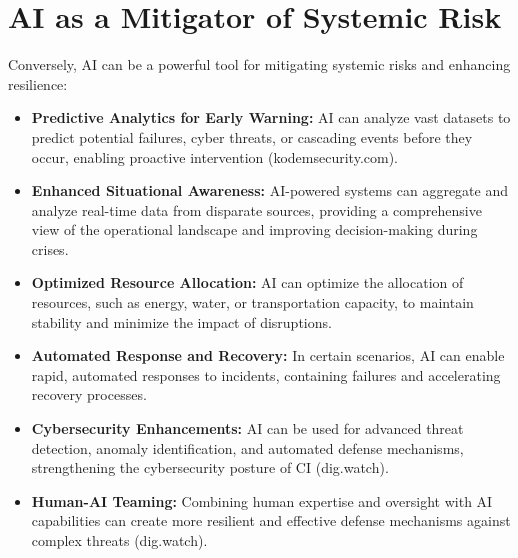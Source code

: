 \section{AI as a Mitigator of Systemic Risk}
Conversely, AI can be a powerful tool for mitigating systemic risks and enhancing resilience:
\begin{itemize}
    \item \textbf{Predictive Analytics for Early Warning:} AI can analyze vast datasets to predict potential failures, cyber threats, or cascading events before they occur, enabling proactive intervention (kodemsecurity.com).
    \item \textbf{Enhanced Situational Awareness:} AI-powered systems can aggregate and analyze real-time data from disparate sources, providing a comprehensive view of the operational landscape and improving decision-making during crises.
    \item \textbf{Optimized Resource Allocation:} AI can optimize the allocation of resources, such as energy, water, or transportation capacity, to maintain stability and minimize the impact of disruptions.
    \item \textbf{Automated Response and Recovery:} In certain scenarios, AI can enable rapid, automated responses to incidents, containing failures and accelerating recovery processes.
    \item \textbf{Cybersecurity Enhancements:} AI can be used for advanced threat detection, anomaly identification, and automated defense mechanisms, strengthening the cybersecurity posture of CI (dig.watch).
    \item \textbf{Human-AI Teaming:} Combining human expertise and oversight with AI capabilities can create more resilient and effective defense mechanisms against complex threats (dig.watch).
\end{itemize}

